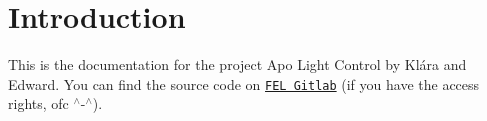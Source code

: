 \hypertarget{index_intro_sec}{}\section{Introduction}\label{index_intro_sec}
This is the documentation for the project Apo Light Control by Klára and Edward. You can find the source code on \href{https://gitlab.fel.cvut.cz/lavusedu/APO_SEM}{\tt F\+EL Gitlab} (if you have the access rights, ofc $^\wedge$-\/$^\wedge$). 